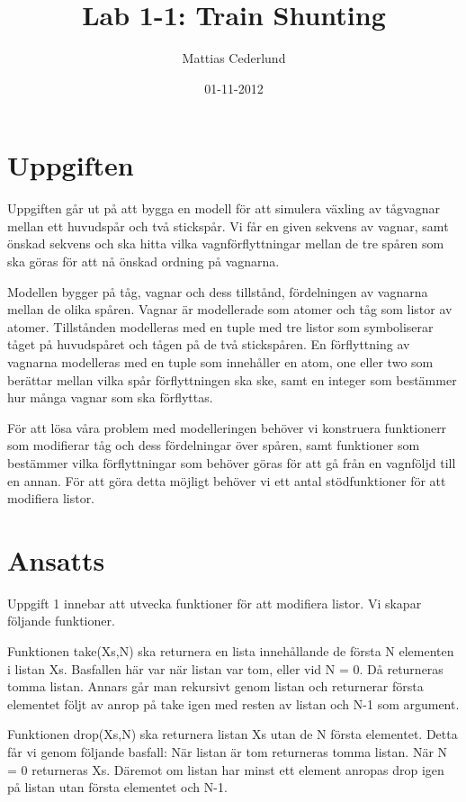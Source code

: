 \documentclass[a4paper, 11pt]{article}
\title{Lab 1-1: Train Shunting}
\author{Mattias Cederlund}
\date{01-11-2012}
\begin{document}
\maketitle 

\section{Uppgiften}

Uppgiften går ut på att bygga en modell för att simulera växling av tågvagnar mellan ett huvudspår och två stickspår. Vi får en given sekvens av vagnar, samt önskad sekvens och ska hitta vilka vagnförflyttningar mellan de tre spåren som ska göras för att nå önskad ordning på vagnarna.

Modellen bygger på tåg, vagnar och dess tillstånd, fördelningen av vagnarna mellan de olika spåren. Vagnar är modellerade som atomer och tåg som listor av atomer. Tillstånden modelleras med en tuple med tre listor som symboliserar tåget på huvudspåret och tågen på de två stickspåren. En förflyttning av vagnarna modelleras med en tuple som innehåller en atom, one eller two som berättar mellan vilka spår förflyttningen ska ske, samt en integer som bestämmer hur många vagnar som ska förflyttas. 

För att lösa våra problem med modelleringen behöver vi konstruera funktionerr som modifierar tåg och dess fördelningar över spåren, samt funktioner som bestämmer vilka förflyttningar som behöver göras för att gå från en vagnföljd till en annan. För att göra detta möjligt behöver vi ett antal stödfunktioner för att modifiera listor.

\section{Ansatts}

Uppgift 1 innebar att utvecka funktioner för att modifiera listor. Vi skapar följande funktioner.

Funktionen take(Xs,N) ska returnera en lista innehållande de första N elementen i listan Xs. Basfallen här var när listan var tom, eller vid N = 0. Då returneras tomma listan. Annars går man rekursivt genom listan och returnerar första elementet följt av anrop på take igen med resten av listan och N-1 som argument.

Funktionen drop(Xs,N) ska returnera listan Xs utan de N första elementet. Detta får vi genom följande basfall: När listan är tom returneras tomma listan. När N = 0 returneras Xs. Däremot om listan har minst ett element anropas drop igen på listan utan första elementet och N-1.
\end{document}
